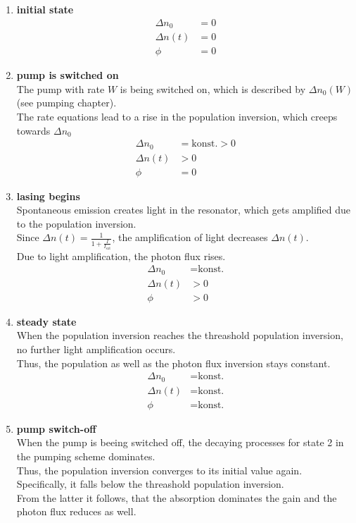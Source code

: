 \documentclass{article}
\begin{document}
\begin{enumerate}
	\item \textbf{initial state}\\
		\begin{align*}
			\Delta n_0 &= 0 \\
			\Delta n(t) &= 0 \\
			\phi &= 0
		\end{align*}
	
	
	\item \textbf{pump is switched on}\\
	The pump with rate $W$ is being switched on, which is described by $\Delta n_0(W)$ (see pumping chapter).\\
	The rate equations lead to a rise in the population inversion, which creeps towards $\Delta n_0$
		\begin{align*}
			\Delta n_0 &= \text{konst.} > 0\\
			\Delta n(t) &> 0\\
			\phi &= 0
		\end{align*}
	
	
	\item \textbf{lasing begins}\\
	Spontaneous emission creates light in the resonator, which gets amplified due to the population inversion.\\
	Since $\Delta n(t) = \frac{1}{1 + \frac{I}{I_\text{sat}}}$, the amplification of light decreases $\Delta n(t)$.\\
	Due to light amplification, the photon flux rises.
		\begin{align*}
			\Delta n_0 &= \text{konst.} \\
			\Delta n(t)& > 0 \\
			\phi &> 0
		\end{align*}
	
	
	\item \textbf{steady state}\\
	When the population inversion reaches the threashold population inversion, no further light amplification occurs.\\
	Thus, the population as well as the photon flux inversion stays constant.
		\begin{align*}
			\Delta n_0 &= \text{konst.} \\
			\Delta n(t)&= \text{konst.} \\
			\phi &= \text{konst.}
		\end{align*}
	
	
	\item \textbf{pump switch-off}\\
	When the pump is beeing switched off, the decaying processes for state 2 in the pumping scheme dominates.\\
	Thus, the population inversion converges to its initial value again. Specifically, it falls below the threashold population inversion.\\
	From the latter it follows, that the absorption dominates the gain and the photon flux reduces as well.
\end{enumerate}
\end{document}
